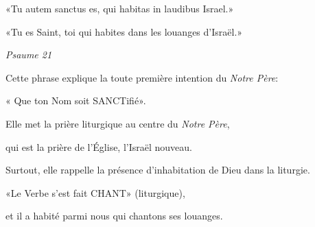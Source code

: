 \documentclass[10pt, twoside, french]{book}
\begin{document}
{
	{\large
		\hfill «Tu autem sanctus es, qui habitas in laudibus Israel.»\par\vspace{\baselineskip}
		\hfill «Tu es Saint, toi qui habites dans les louanges d'Israël.»\par\vspace{\baselineskip}
	}
	
	\hfill \emph{Psaume 21}\par

\vspace{4\baselineskip}

Cette phrase explique la toute première intention du \textit{Notre Père}:\par
\hfill« Que ton Nom soit SANCTifié».\par
\vspace{\baselineskip}
Elle met la prière liturgique au centre du \textit{Notre Père},\par
\hfill qui est la prière de l'Église, l'Israël nouveau.\par
\vspace{\baselineskip}
Surtout, elle rappelle la présence d'inhabitation de Dieu dans la liturgie.\par
\vspace{\baselineskip}
«Le Verbe s'est fait CHANT» (liturgique),\par
\hfill et il a habité parmi nous qui chantons ses louanges.\par

}

\newpage


\newpage

\thispagestyle{empty}
\printindex[K]
\printindex[I]
\printindex[G]
\printindex[AL]
\printindex[S]
\printindex[O]
\printindex[C]
\printindex[H]
\printindex[A]
\printindex[R]
\printindex[P]
\end{document}
